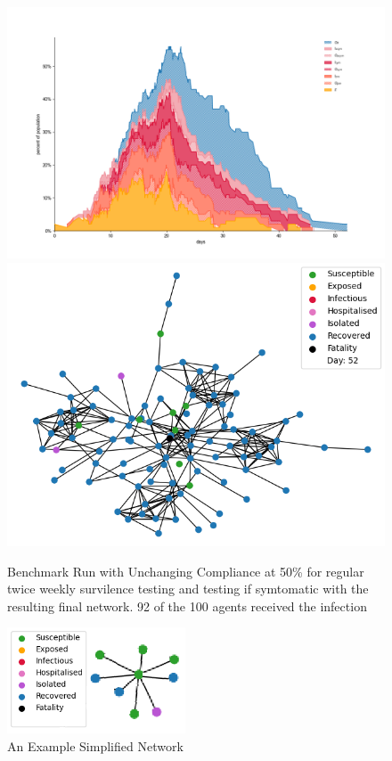 \documentclass{article}
\begin{document}
\begin{figure}
  \centering
      \includegraphics[width=\textwidth]{Figure3}
      \includegraphics[width=\textwidth]{Figure3Net}
  \caption{Benchmark Run with Unchanging Compliance at 50\% for regular twice weekly survilence testing and testing if symtomatic with the resulting final network. 92 of the 100 agents received the infection}
\end{figure}

\begin{figure}
  \centering
      \includegraphics[width =150pt]{basicnet}
  \caption{An Example Simplified Network}
\end{figure}
\end{document}
